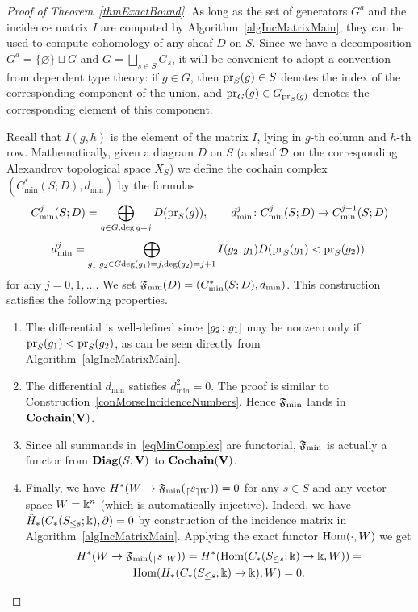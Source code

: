 \begin{proof}[Proof of Theorem~\ref{thmExactBound}]
As long as the set of generators $G^a$ and the incidence matrix $I$ are computed by Algorithm~\ref{algIncMatrixMain}, they can be used to compute cohomology of any sheaf $D$ on $S$. Since we have a decomposition $G^a=\{\varnothing\}\sqcup G$ and $G=\bigsqcup_{s\in S}G_s$, it will be convenient to adopt a convention from dependent type theory: if $g\in G$, then $\operatorname{pr}_S(g)\in S$ denotes the index of the corresponding component of the union, and $\operatorname{pr}_G(g)\in G_{\operatorname{pr}_S(g)}$ denotes the corresponding element of this component.

Recall that $I(g,h)$ is the element of the matrix $I$, lying in $g$-th column and $h$-th row. Mathematically, given a diagram $D$ on $S$ (a sheaf $\mathcal{D}$ on the corresponding Alexandrov topological space $X_S$) we define the cochain complex $(C^*_{\min}(S;D), d_{\min})$ by the formulas
\begin{equation}\label{eqMinComplex}
C^j_{\min}(S;D)=\bigoplus_{g\in G,\deg g=j}D(\operatorname{pr}_S(g)), \qquad d_{\min}^j\colon C^j_{\min}(S;D)\to C^{j+1}_{\min}(S;D)
\end{equation}
\begin{equation}\label{eqMinComplexDifferential}
d_{\min}^j=\bigoplus_{\substack{g_1,g_2\in G}{\deg(g_1)=j,\deg(g_2)=j+1}}I(g_2,g_1)D(\operatorname{pr}_S(g_1)<\operatorname{pr}_S(g_2)).
\end{equation}
for any $j=0,1,\ldots$. We set $\mathfrak{F}_{\min}(D)=(C^*_{\min}(S;D), d_{\min})$. This construction satisfies the following properties.

\begin{enumerate}
  \item The differential is well-defined since $[g_2\colon g_1]$ may be nonzero only if $\operatorname{pr}_S(g_1)<\operatorname{pr}_S(g_2)$, as can be seen directly from Algorithm~\ref{algIncMatrixMain}.
  \item The differential $d_{\min}$ satisfies $d_{\min}^2=0$. The proof is similar to Construction~\ref{conMorseIncidenceNumbers}. Hence $\mathfrak{F}_{\min}$ lands in $\mathbf{Cochain}(\mathbf{V})$.
  \item Since all summands in~\eqref{eqMinComplex} are functorial, $\mathfrak{F}_{\min}$ is actually a functor from $\mathbf{Diag}(S;\mathbf{V})$ to $\mathbf{Cochain}(\mathbf{V})$.
  \item Finally, we have $H^*(W\to\mathfrak{F}_{\min}({_{\lceil}s_{\rceil W}}))=0$ for any $s\in S$ and any vector space $W=\Bbbk^n$ (which is automatically injective). Indeed, we have $\tilde{H}_*(C_*(S_{\leq s};\Bbbk),\partial)=0$ by construction of the incidence matrix in Algorithm~\ref{algIncMatrixMain}. Applying the exact functor $\operatorname{Hom}(\cdot,W)$ we get
      \begin{multline*}
      H^*(W\to\mathfrak{F}_{\min}({_{\lceil}s_{\rceil W}}))=H^*(\operatorname{Hom}(C_*(S_{\leq s};\Bbbk)\to\Bbbk,W))= \\
      \operatorname{Hom}(H_*(C_*(S_{\leq s};\Bbbk)\to\Bbbk),W)=0.
      \end{multline*}
\end{enumerate}


\end{proof}
